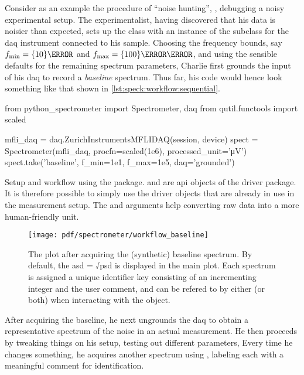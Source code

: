 Consider as an example the procedure of \enquote{noise hunting}, \ie, debugging a noisy experimental setup.
The experimentalist,
having discovered that his data is noisier than expected, sets up the  class with an instance of the  subclass for the \gls{daq} instrument connected to his sample.
Choosing the frequency bounds, say $\fmin = \qty{10}{\hertz}$ and $\fmax = \qty{100}{\kilo\hertz}$, and using the sensible defaults for the remaining spectrum parameters, Charlie first grounds the input of his \gls{daq} to record a \emph{baseline} spectrum.
Thus far, his code would hence look something like that shown in \cref{lst:speck:workflow:sequential}.

\begin{listing}[htpb]
    \begin{py}
        from python_spectrometer import Spectrometer, daq
        from qutil.functools import scaled

        mfli_daq = daq.ZurichInstrumentsMFLIDAQ(session, device)
        spect = Spectrometer(mfli_daq, procfn=scaled(1e6),
                             processed_unit='μV')
        spect.take('baseline', f_min=1e1, f_max=1e5, daq='grounded')
    \end{py}
    \caption[\pyspeck workflow]{
        Setup and workflow using the \pyspeck package.
         and  are \gls{api} objects of the  driver package.
        It is therefore possible to simply use the driver objects that are already in use in the measurement setup.
        The  and  arguments help converting raw data into a more human-friendly unit.
    }
    \label{lst:speck:workflow:sequential}
\end{listing}
\begin{figure}[htpb]
    \centering
    \texttt{[image: pdf/spectrometer/workflow\_baseline]}
    \caption{
        The \pyspeck plot after acquiring the (synthetic) baseline spectrum.
        By default, the \gls{asd} = √\gls{psd} is displayed in the main plot.
        Each spectrum is assigned a unique identifier key consisting of an incrementing integer and the user comment, and can be refered to by either (or both) when interacting with the object.
    }
    \label{fig:speck:software:workflow_baseline}
\end{figure}

After acquiring the baseline, he next ungrounds the \gls{daq} to obtain a representative spectrum of the noise in an actual measurement.
He then proceeds by tweaking things on his setup, testing out different parameters, \etc
Every time he changes something, he acquires another spectrum using , labeling each with a meaningful comment for identification.

